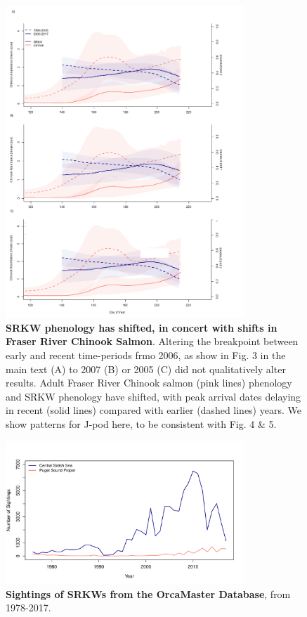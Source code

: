 \documentclass{article}
\begin{document}
\newpage
\begin{figure}[p]
\includegraphics[width=0.8\textwidth]{../analyses/orcaphen/figures/orcachinphenoverlapJ20052007.png}
\caption{\textbf{SRKW phenology has shifted, in concert with shifts in Fraser River Chinook Salmon}. Altering the breakpoint between early and recent time-periods frmo 2006, as show in Fig. 3 in the main text (A) to 2007 (B) or 2005 (C) did not qualitatively alter results.  Adult Fraser River Chinook salmon (pink lines) phenology and SRKW phenology have shifted, with peak arrival dates delaying in recent (solid lines) compared with earlier (dashed lines) years. We show patterns for J-pod here, to be consistent with Fig. 4 \& 5. }
\label{fig:KLchin}
\end{figure}
\newpage

\begin{figure}[p]
\includegraphics[width=0.8\textwidth]{../analyses/figures/OrcaPhenPlots/numsights_1976_2regs.pdf} 
\caption{\textbf{Sightings of SRKWs from the OrcaMaster Database}, from 1978-2017. }
\label{fig:sights}
\end{figure}
\end{document}

